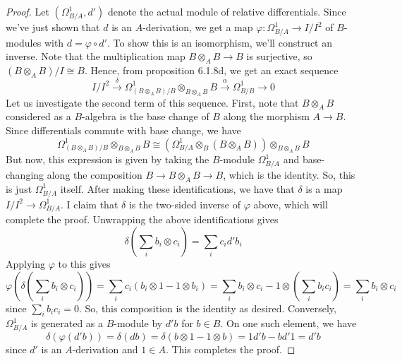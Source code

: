 \begin{proof}
	Let $(\Omega_{B/A}^1, d')$ denote the actual module of relative differentials. Since we've just shown that $d$ is an $A$-derivation, we get a map $\varphi : \Omega_{B/A}^1 \to I/I^2$ of $B$-modules with $d = \varphi \circ d'$. To show this is an isomorphism, we'll construct an inverse. Note that the multiplication map $B \otimes_A B \to B$ is surjective, so $(B \otimes_A B)/I \cong B$. Hence, from proposition 6.1.8d, we get an exact sequence
	\[ I/I^2 \xrightarrow{\delta} \Omega^1_{(B \otimes_A B)/B} \otimes_{B \otimes_A B} B \xrightarrow{\alpha} \Omega^1_{B/B} \to 0 \]
	Let us investigate the second term of this sequence. First, note that $B \otimes_A B$ considered as a $B$-algebra is the base change of $B$ along the morphism $A \to B$. Since differentials commute with base change, we have
	\[ \Omega^1_{(B \otimes_A B)/B} \otimes_{B \otimes_A B} B \cong (\Omega^1_{B/A} \otimes_B (B \otimes_A B)) \otimes_{B \otimes_A B} B \]
	But now, this expression is given by taking the $B$-module $\Omega^1_{B/A}$ and base-changing along the composition $B \to B \otimes_A B \to B$, which is the identity. So, this is just $\Omega^1_{B/A}$ itself. After making these identifications, we have that $\delta$ is a map $I/I^2 \to \Omega^1_{B/A}$. I claim that $\delta$ is the two-sided inverse of $\varphi$ above, which will complete the proof. Unwrapping the above identifications gives
	\[ \delta(\sum_i b_i \otimes c_i) = \sum_i c_id'b_i \]
	Applying $\varphi$ to this gives
	\[ \varphi(\delta(\sum_i b_i \otimes c_i)) = \sum_i c_i(b_i \otimes 1 - 1 \otimes b_i) = \sum_i b_i \otimes c_i - 1 \otimes (\sum_i b_ic_i) = \sum_i b_i \otimes c_i \]
	since $\sum_i b_ic_i = 0$. So, this composition is the identity as desired. Conversely, $\Omega_{B/A}^1$ is generated as a $B$-module by $d'b$ for $b \in B$. On one such element, we have
	\[ \delta(\varphi(d'b)) = \delta(db) = \delta(b \otimes 1 - 1 \otimes b) = 1d'b - bd'1 = d'b \]
	since $d'$ is an $A$-derivation and $1 \in A$. This completes the proof.
\end{proof}
